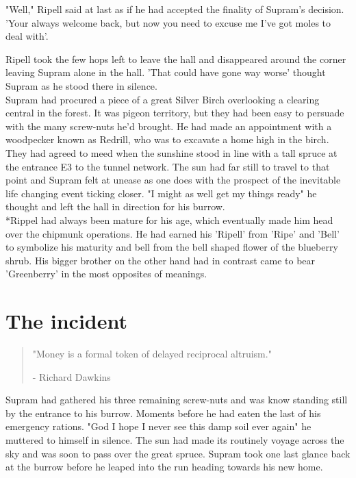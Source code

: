 \documentclass[smalldemyvopaper,11pt,twoside,onecolumn,openright,extrafontsizes]{memoir}
\begin{document}
"Well," Ripell said at last as if he had accepted the finality of Supram's decision. 'Your always welcome back, but now you need to excuse me I've got moles to deal with'.

Ripell took the few hops left to leave the hall and disappeared around the corner leaving Supram alone in the hall. 'That could have gone way worse' thought Supram as he stood there in silence. \\

Supram had procured a piece of a great Silver Birch overlooking a clearing central in the forest. It was pigeon territory, but they had been easy to persuade with the many screw-nuts he'd brought. He had made an appointment with a woodpecker known as Redrill, who was to excavate a home high in the birch. They had agreed to meed when the sunshine stood in line with a tall spruce at the entrance E3 to the tunnel network. The sun had far still to travel to that point and Supram felt at unease as one does with the prospect of the inevitable life changing event ticking closer. "I might as well get my things ready" he thought and left the hall in direction for his burrow.\\

*Rippel had always been mature for his age, which eventually made him head over the chipmunk operations. He had earned his 'Ripell' from 'Ripe' and 'Bell' to symbolize his maturity and bell from the bell shaped flower of the blueberry shrub. His bigger brother on the other hand had in contrast came to bear 'Greenberry' in the most opposites of meanings.  

\chapter{The incident}

\vspace{-1.3cm}
\begin{localsize}{10}
	\begin{quote}
		"Money is a formal token of delayed reciprocal altruism."
		\begin{flushright}- Richard Dawkins \end{flushright}
	\end{quote} 
\end{localsize}
\vspace{1cm}


Supram had gathered his three remaining screw-nuts and was know standing still by the entrance to his burrow. Moments before he had eaten the last of his 
emergency rations. "God I hope I never see this damp soil ever again" he muttered to himself in silence. The sun had made its routinely voyage across the sky and was soon to pass over the great spruce. Supram took one last glance back at the burrow before he leaped into the run heading towards his new home. 
\end{document}
